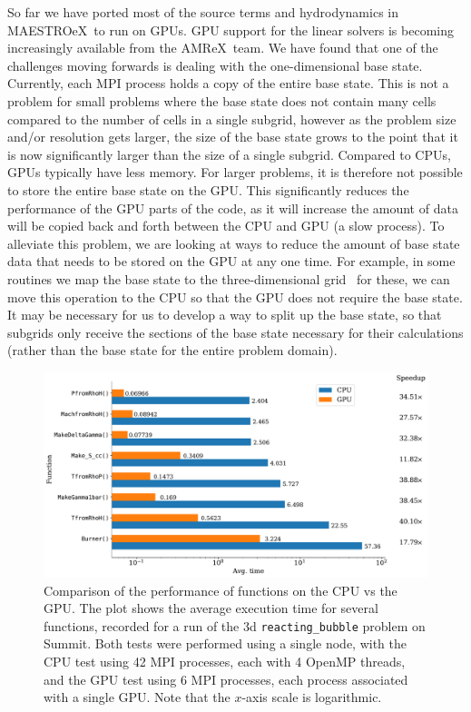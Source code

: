 \documentclass[a4paper]{jpconf}
\newcommand{\maestroex}{{\sffamily MAESTROeX}}
\newcommand{\amrex}{{\sffamily AMReX}}
\begin{document}
So far we have ported most of the source terms and hydrodynamics in \maestroex~to run on GPUs. GPU support for the linear solvers is becoming increasingly available from the \amrex~team.  We have found that one of the challenges moving forwards is dealing with the one-dimensional base state. Currently, each MPI process holds a copy of the entire base state. This is not a problem for small problems where the base state does not contain many cells compared to the number of cells in a single subgrid, however as the problem size and/or resolution gets larger, the size of the base state grows to the point that it is now significantly larger than the size of a single subgrid. Compared to CPUs, GPUs typically have less memory. For larger problems, it is therefore not possible to store the entire base state on the GPU. This significantly reduces the performance of the GPU parts of the code, as it will increase the amount of data will be copied back and forth between the CPU and GPU (a slow process). To alleviate this problem, we are looking at ways to reduce the amount of base state data that needs to be stored on the GPU at any one time. For example, in some routines we map the base state to the three-dimensional grid \textendash~for these, we can move this operation to the CPU so that the GPU does not require the base state. It may be necessary for us to develop a way to split up the base state, so that subgrids only receive the sections of the base state necessary for their calculations (rather than the base state for the entire problem domain). 

\begin{figure}
    \centering
    \includegraphics[width=\textwidth]{plots/gpu_speedup}
    \caption{Comparison of the performance of functions on the CPU vs the GPU. The plot shows the average execution time for several functions, recorded for a run of the 3d \texttt{reacting\_bubble} problem on Summit. Both tests were performed using a single node, with the CPU test using 42 MPI processes, each with 4 OpenMP threads, and the GPU test using 6 MPI processes, each process associated with a single GPU. Note that the $x$-axis scale is logarithmic.}\label{fig:gpu_speedup}
\end{figure}
\end{document}
